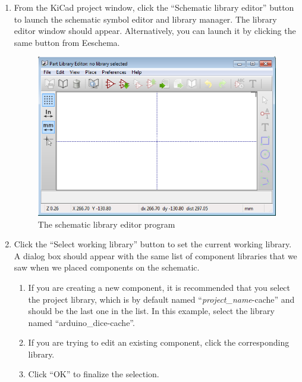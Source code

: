 \documentclass[12pt,letterpaper]{scrartcl}
\begin{document}
\begin{enumerate}
	\item From the KiCad project window, click the ``Schematic library editor'' button to launch the schematic symbol editor and library manager. The library editor window should appear. Alternatively, you can launch it by clicking the same button from Eeschema.
	
	\begin{figure}[h]
		\centering
		\includegraphics[width=0.6\linewidth]{sche-lib-editor}
		\caption{The schematic library editor program}
		\label{fig:sche-lib-editor}
	\end{figure}
	
	\item Click the ``Select working library'' button to set the current working library. A dialog box should appear with the same list of component libraries that we saw when we placed components on the schematic. 
		\begin{enumerate}
			\item If you are creating a new component, it is recommended that you select the project library, which is by default named ``\textit{project\_name}-cache'' and should be the last one in the list. In this example, select the library named ``arduino\_dice-cache''. 
			
			\item If you are trying to edit an existing component, click the corresponding library.
			
			\item Click ``OK'' to finalize the selection. 
		\end{enumerate}
	

\end{enumerate}
\end{document}
